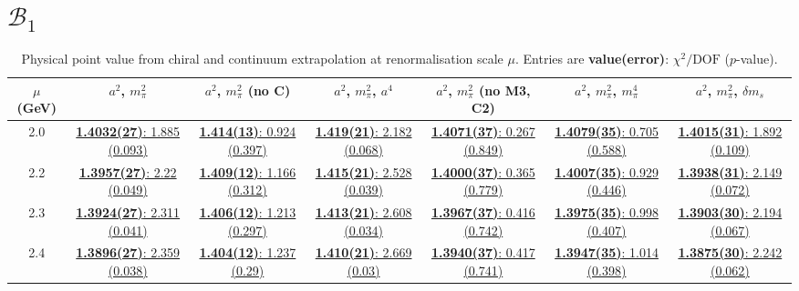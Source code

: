 \documentclass[12pt]{extarticle}
\begin{document}
\clearpage
\section{$\mathcal{B}_1$}
\begin{table}[h!]
\begin{center}
\begin{tabular}{|c|c|c|c|c|c|c|}
\hline
$\mu$ (GeV) & $a^2$, $m_\pi^2$& $a^2$, $m_\pi^2$ (no C)& $a^2$, $m_\pi^2$, $a^4$& $a^2$, $m_\pi^2$ (no M3, C2)& $a^2$, $m_\pi^2$, $m_\pi^4$& $a^2$, $m_\pi^2$, $\delta m_s$\\
\hline
2.0& \hyperlink{VVpAA/SUSY/a2m2_20.pdf.1}{\textbf{1.4032(27)}: 1.885 (0.093)} & \hyperlink{VVpAA/SUSY/a2m2noC_20.pdf.1}{\textbf{1.414(13)}: 0.924 (0.397)} & \hyperlink{VVpAA/SUSY/a2a4m2_20.pdf.1}{\textbf{1.419(21)}: 2.182 (0.068)} & \hyperlink{VVpAA/SUSY/a2m2mcut_20.pdf.1}{\textbf{1.4071(37)}: 0.267 (0.849)} & \hyperlink{VVpAA/SUSY/a2m2m4_20.pdf.1}{\textbf{1.4079(35)}: 0.705 (0.588)} & \hyperlink{VVpAA/SUSY/a2m2delm_20.pdf.1}{\textbf{1.4015(31)}: 1.892 (0.109)}\\
2.2& \hyperlink{VVpAA/SUSY/a2m2_22.pdf.1}{\textbf{1.3957(27)}: 2.22 (0.049)} & \hyperlink{VVpAA/SUSY/a2m2noC_22.pdf.1}{\textbf{1.409(12)}: 1.166 (0.312)} & \hyperlink{VVpAA/SUSY/a2a4m2_22.pdf.1}{\textbf{1.415(21)}: 2.528 (0.039)} & \hyperlink{VVpAA/SUSY/a2m2mcut_22.pdf.1}{\textbf{1.4000(37)}: 0.365 (0.779)} & \hyperlink{VVpAA/SUSY/a2m2m4_22.pdf.1}{\textbf{1.4007(35)}: 0.929 (0.446)} & \hyperlink{VVpAA/SUSY/a2m2delm_22.pdf.1}{\textbf{1.3938(31)}: 2.149 (0.072)}\\
2.3& \hyperlink{VVpAA/SUSY/a2m2_23.pdf.1}{\textbf{1.3924(27)}: 2.311 (0.041)} & \hyperlink{VVpAA/SUSY/a2m2noC_23.pdf.1}{\textbf{1.406(12)}: 1.213 (0.297)} & \hyperlink{VVpAA/SUSY/a2a4m2_23.pdf.1}{\textbf{1.413(21)}: 2.608 (0.034)} & \hyperlink{VVpAA/SUSY/a2m2mcut_23.pdf.1}{\textbf{1.3967(37)}: 0.416 (0.742)} & \hyperlink{VVpAA/SUSY/a2m2m4_23.pdf.1}{\textbf{1.3975(35)}: 0.998 (0.407)} & \hyperlink{VVpAA/SUSY/a2m2delm_23.pdf.1}{\textbf{1.3903(30)}: 2.194 (0.067)}\\
2.4& \hyperlink{VVpAA/SUSY/a2m2_24.pdf.1}{\textbf{1.3896(27)}: 2.359 (0.038)} & \hyperlink{VVpAA/SUSY/a2m2noC_24.pdf.1}{\textbf{1.404(12)}: 1.237 (0.29)} & \hyperlink{VVpAA/SUSY/a2a4m2_24.pdf.1}{\textbf{1.410(21)}: 2.669 (0.03)} & \hyperlink{VVpAA/SUSY/a2m2mcut_24.pdf.1}{\textbf{1.3940(37)}: 0.417 (0.741)} & \hyperlink{VVpAA/SUSY/a2m2m4_24.pdf.1}{\textbf{1.3947(35)}: 1.014 (0.398)} & \hyperlink{VVpAA/SUSY/a2m2delm_24.pdf.1}{\textbf{1.3875(30)}: 2.242 (0.062)}\\
\hline
\end{tabular}
\caption{Physical point value from chiral and continuum extrapolation at renormalisation scale $\mu$. Entries are \textbf{value(error)}: $\chi^2/\text{DOF}$ ($p$-value).}
\end{center}
\end{table}
\end{document}
